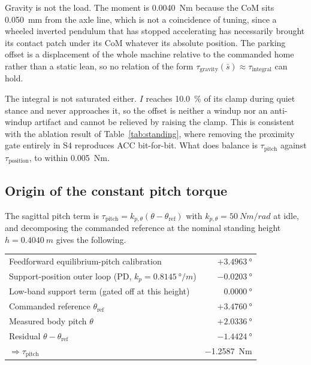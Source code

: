 \documentclass[a4paper,fleqn]{cas-dc}
\begin{document}
Gravity is not the load. The moment is \SI{0.0040}{Nm} because the CoM sits
\SI{0.050}{mm} from the axle line, which is not a coincidence of tuning, since a
wheeled inverted pendulum that has stopped accelerating has necessarily brought
its contact patch under its CoM whatever its absolute position. The parking
offset is a displacement of the whole machine relative to the commanded home
rather than a static lean, so no relation of the form
$\tau_{\text{gravity}}(\bar{s})\approx\tau_{\text{integral}}$ can hold.

The integral is not saturated either. $I$ reaches \SI{10.0}{\percent} of its
clamp during quiet stance and never approaches it, so the offset is neither a
windup nor an anti-windup artifact and cannot be relieved by raising the clamp.
This is consistent with the ablation result of Table~\ref{tab:standing}, where
removing the proximity gate entirely in S4 reproduces ACC bit-for-bit. What does
balance is $\tau_{\text{pitch}}$ against $\tau_{\text{position}}$, to within
\SI{0.005}{Nm}.

\subsection{Origin of the constant pitch torque}

The sagittal pitch term is
$\tau_{\text{pitch}}=k_{p,\theta}(\theta-\theta_{\text{ref}})$ with
$k_{p,\theta}=\SI{50}{Nm/rad}$ at idle, and decomposing the commanded reference
at the nominal standing height $h{=}\SI{0.4040}{m}$ gives the following.

\begin{center}\footnotesize
\begin{tabular}{lr}
\hline
Feedforward equilibrium-pitch calibration & $+\SI{3.4963}{\degree}$ \\
Support-position outer loop (PD, $k_p{=}\SI{0.8145}{\degree/m}$) & $-\SI{0.0203}{\degree}$ \\
Low-band support term (gated off at this height) & $\phantom{+}\SI{0.0000}{\degree}$ \\
\hline
Commanded reference $\theta_{\text{ref}}$ & $+\SI{3.4760}{\degree}$ \\
Measured body pitch $\theta$ & $+\SI{2.0336}{\degree}$ \\
\hline
Residual $\theta-\theta_{\text{ref}}$ & $-\SI{1.4424}{\degree}$ \\
$\Rightarrow \tau_{\text{pitch}}$ & \SI{-1.2587}{Nm} \\
\hline
\end{tabular}
\end{center}
\end{document}

